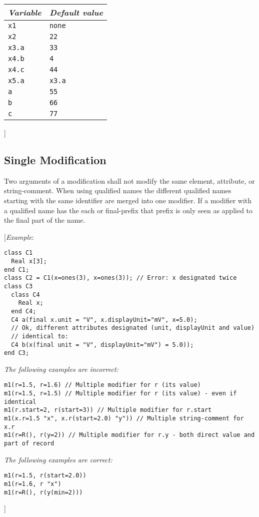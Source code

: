 \begin{longtable}[]{|@{}l|l@{}|}
\hline \endhead
\emph{Variable} & \emph{Default value}\\ \hline
\lstinline!x1! & \lstinline!none!\\ \hline
\lstinline!x2! & \lstinline!22!\\ \hline
\lstinline!x3.a! & \lstinline!33!\\ \hline
\lstinline!x4.b! & \lstinline!4!\\ \hline
\lstinline!x4.c! & \lstinline!44!\\ \hline
\lstinline!x5.a! & \lstinline!x3.a!\\ \hline
\lstinline!a! & \lstinline!55!\\ \hline
\lstinline!b! & \lstinline!66!\\ \hline
\lstinline!c! & \lstinline!77!\\ \hline
\end{longtable}

{]}

\subsection{Single Modification}

Two arguments of a modification shall not modify the same element,
attribute, or string-comment. When using qualified names the different
qualified names starting with the same identifier are merged into one
modifier. If a modifier with a qualified name has the each or
final-prefix that prefix is only seen as applied to the final part of
the name.

{[}\emph{Example}:
\begin{lstlisting}[language=modelica]
class C1
  Real x[3];
end C1;
class C2 = C1(x=ones(3), x=ones(3)); // Error: x designated twice
class C3
  class C4
    Real x;
  end C4;
  C4 a(final x.unit = "V", x.displayUnit="mV", x=5.0);
  // Ok, different attributes designated (unit, displayUnit and value)
  // identical to:
  C4 b(x(final unit = "V", displayUnit="mV") = 5.0));
end C3;
\end{lstlisting}

\emph{The following examples are incorrect:}
\begin{lstlisting}[language=modelica]
m1(r=1.5, r=1.6) // Multiple modifier for r (its value)
m1(r=1.5, r=1.5) // Multiple modifier for r (its value) - even if identical
m1(r.start=2, r(start=3)) // Multiple modifier for r.start
m1(x.r=1.5 "x", x.r(start=2.0) "y")) // Multiple string-comment for x.r
m1(r=R(), r(y=2)) // Multiple modifier for r.y - both direct value and part of record
\end{lstlisting}
\emph{The following examples are correct:}
\begin{lstlisting}[language=modelica]
m1(r=1.5, r(start=2.0))
m1(r=1.6, r "x")
m1(r=R(), r(y(min=2)))
\end{lstlisting}
{]}

